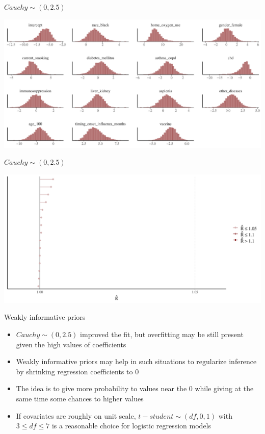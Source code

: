 \documentclass[ignorenonframetext,a4paper]{beamer}
\begin{document}
\begin{frame}{\(Cauchy \sim \left( 0, 2.5 \right)\)}

\includegraphics{DB_presentation_case_study_files/figure-beamer/unnamed-chunk-32-1.pdf}

\end{frame}

\begin{frame}{\(Cauchy \sim \left( 0, 2.5 \right)\)}

\includegraphics{DB_presentation_case_study_files/figure-beamer/unnamed-chunk-33-1.pdf}

\end{frame}

\begin{frame}{Weakly informative priors}

\begin{itemize}
\item
  \(Cauchy \sim \left( 0, 2.5 \right)\) improved the fit, but
  overfitting may be still present given the high values of coefficients
\item
  Weakly informative priors may help in such situations to regularize
  inference by shrinking regression coefficients to \(0\)
\item
  The idea is to give more probability to values near the \(0\) while
  giving at the same time some chances to higher values
\item
  If covariates are roughly on unit scale,
  \(t-student \sim \left(df, 0, 1 \right)\) with \(3 \leq df \leq 7\) is
  a reasonable choice for logistic regression models
\end{itemize}

\end{frame}
\end{document}
